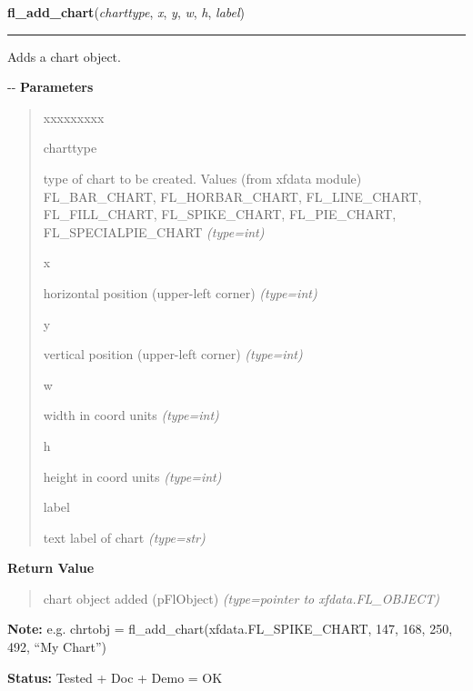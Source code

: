     \vspace{0.5ex}

\hspace{.8\funcindent}\begin{boxedminipage}{\funcwidth}

    \raggedright \textbf{fl\_add\_chart}(\textit{charttype}, \textit{x}, \textit{y}, \textit{w}, \textit{h}, \textit{label})

    \vspace{-1.5ex}

    \rule{\textwidth}{0.5\fboxrule}
\setlength{\parskip}{2ex}

Adds a chart object.

-{}-
\setlength{\parskip}{1ex}
      \textbf{Parameters}
      \vspace{-1ex}

      \begin{quote}
        \begin{Ventry}{xxxxxxxxx}

          \item[charttype]


type of chart to be created. Values (from xfdata module)
FL\_BAR\_CHART, FL\_HORBAR\_CHART, FL\_LINE\_CHART, FL\_FILL\_CHART,
FL\_SPIKE\_CHART, FL\_PIE\_CHART, FL\_SPECIALPIE\_CHART
            {\it (type=int)}

          \item[x]


horizontal position (upper-left corner)
            {\it (type=int)}

          \item[y]


vertical position (upper-left corner)
            {\it (type=int)}

          \item[w]


width in coord units
            {\it (type=int)}

          \item[h]


height in coord units
            {\it (type=int)}

          \item[label]


text label of chart
            {\it (type=str)}

        \end{Ventry}

      \end{quote}

      \textbf{Return Value}
    \vspace{-1ex}

      \begin{quote}

chart object added (pFlObject)
      {\it (type=pointer to xfdata.FL\_OBJECT)}

      \end{quote}

\textbf{Note:} 
e.g. chrtobj = fl\_add\_chart(xfdata.FL\_SPIKE\_CHART, 147, 168,
250, 492, ``My Chart'')


\textbf{Status:} 
Tested + Doc + Demo = OK


    \end{boxedminipage}

